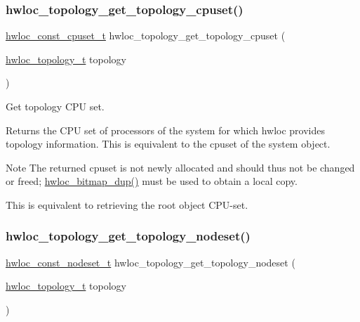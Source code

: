 \subsubsection{\texorpdfstring{hwloc\+\_\+topology\+\_\+get\+\_\+topology\+\_\+cpuset()}{hwloc\_topology\_get\_topology\_cpuset()}}
{\footnotesize\ttfamily \hyperlink{a00183_ga1f784433e9b606261f62d1134f6a3b25}{hwloc\+\_\+const\+\_\+cpuset\+\_\+t} hwloc\+\_\+topology\+\_\+get\+\_\+topology\+\_\+cpuset (\begin{DoxyParamCaption}\item[{\hyperlink{a00186_ga9d1e76ee15a7dee158b786c30b6a6e38}{hwloc\+\_\+topology\+\_\+t}}]{topology }\end{DoxyParamCaption})}



Get topology C\+PU set. 

\begin{DoxyReturn}{Returns}
the C\+PU set of processors of the system for which hwloc provides topology information. This is equivalent to the cpuset of the system object.
\end{DoxyReturn}
\begin{DoxyNote}{Note}
The returned cpuset is not newly allocated and should thus not be changed or freed; \hyperlink{a00205_gae679434c1a5f41d3560a8a7e2c1b0dee}{hwloc\+\_\+bitmap\+\_\+dup()} must be used to obtain a local copy.

This is equivalent to retrieving the root object C\+P\+U-\/set. 
\end{DoxyNote}
\mbox{\label{a00202_ga3fd37303e99ace8b0d0ea03f95f8c514}} 
\subsubsection{\texorpdfstring{hwloc\+\_\+topology\+\_\+get\+\_\+topology\+\_\+nodeset()}{hwloc\_topology\_get\_topology\_nodeset()}}
{\footnotesize\ttfamily \hyperlink{a00183_ga2f5276235841ad66a79bedad16a5a10c}{hwloc\+\_\+const\+\_\+nodeset\+\_\+t} hwloc\+\_\+topology\+\_\+get\+\_\+topology\+\_\+nodeset (\begin{DoxyParamCaption}\item[{\hyperlink{a00186_ga9d1e76ee15a7dee158b786c30b6a6e38}{hwloc\+\_\+topology\+\_\+t}}]{topology }\end{DoxyParamCaption})}



